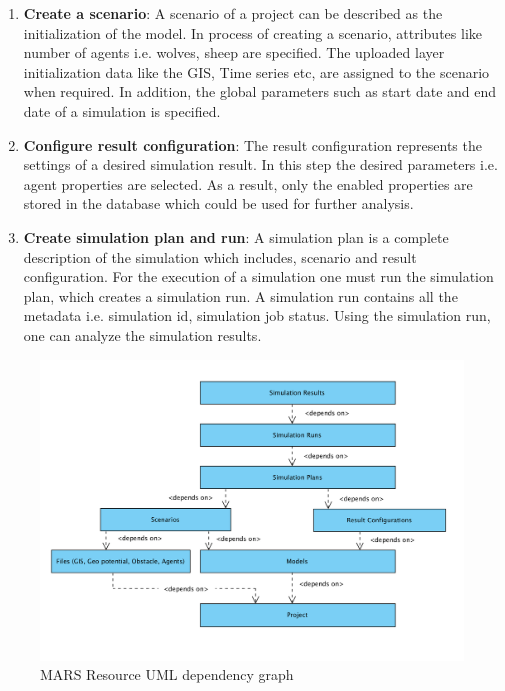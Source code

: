 \begin{enumerate}
            \item 
                \textbf{Create a scenario}: A scenario of a project can be described as the initialization of the model.
                In process of creating a scenario, attributes like number of agents i.e. wolves, sheep are specified. 
                The uploaded layer initialization data like the GIS, Time series etc, are assigned to the scenario when required. In addition,
                the global parameters such as start date and end date of a simulation is specified.

            \item 
                \textbf{Configure result configuration}: The result configuration represents the settings of a desired simulation result. In this step the desired parameters
                i.e. agent properties are selected. As a result, only the enabled properties are stored in the database which could be used for further analysis.

            \item  
                \textbf{Create simulation plan and run}: A simulation plan is a complete description of the
                 simulation which includes, scenario and result configuration. For the execution of a simulation
                 one must run the simulation plan, which creates
                 a simulation run. A simulation run contains all the metadata i.e. simulation id, simulation 
                 job status. Using the simulation run, one can analyze the 
                 simulation results.
        \end{enumerate} 
        
        \begin{figure}[H]
            \centering \includegraphics[scale=0.6]{grafiken/marsDependency.png}
            \caption{MARS Resource UML dependency graph}
            \label{fig:marsDependency}
        \end{figure}
        
